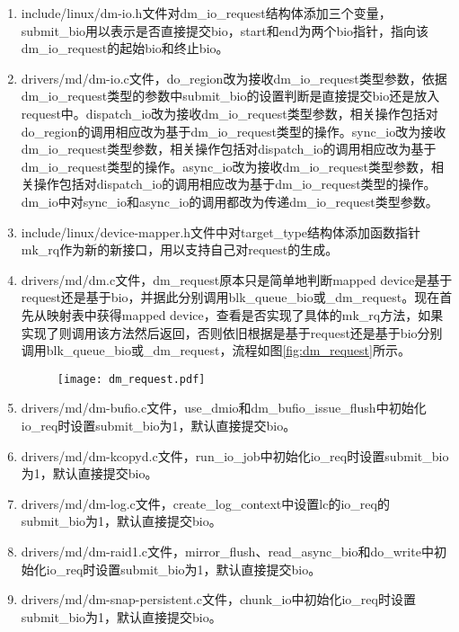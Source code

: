 \begin{enumerate}
    \item include/linux/dm-io.h文件对dm\_io\_request结构体添加三个变量，submit\_bio用以表示是否直接提交bio，start和end为两个bio指针，指向该dm\_io\_request的起始bio和终止bio。
    \item drivers/md/dm-io.c文件，do\_region改为接收dm\_io\_request类型参数，依据dm\_io\_request类型的参数中submit\_bio的设置判断是直接提交bio还是放入request中。dispatch\_io改为接收dm\_io\_request类型参数，相关操作包括对do\_region的调用相应改为基于dm\_io\_request类型的操作。sync\_io改为接收dm\_io\_request类型参数，相关操作包括对dispatch\_io的调用相应改为基于dm\_io\_request类型的操作。async\_io改为接收dm\_io\_request类型参数，相关操作包括对dispatch\_io的调用相应改为基于dm\_io\_request类型的操作。dm\_io中对sync\_io和async\_io的调用都改为传递dm\_io\_request类型参数。
    \item include/linux/device-mapper.h文件中对target\_type结构体添加函数指针mk\_rq作为新的新接口，用以支持自己对request的生成。
    \item drivers/md/dm.c文件，dm\_request原本只是简单地判断mapped device是基于request还是基于bio，并据此分别调用blk\_queue\_bio或\_dm\_request。现在首先从映射表中获得mapped device，查看是否实现了具体的mk\_rq方法，如果实现了则调用该方法然后返回，否则依旧根据是基于request还是基于bio分别调用blk\_queue\_bio或\_dm\_request，流程如图\ref{fig:dm_request}所示。

    \begin{figure}[!htbp]
        \centering
        \texttt{[image: dm\_request.pdf]}
    \end{figure}

    \item drivers/md/dm-bufio.c文件，use\_dmio和dm\_bufio\_issue\_flush中初始化io\_req时设置submit\_bio为1，默认直接提交bio。
    \item drivers/md/dm-kcopyd.c文件，run\_io\_job中初始化io\_req时设置submit\_bio为1，默认直接提交bio。
    \item drivers/md/dm-log.c文件，create\_log\_context中设置lc的io\_req的submit\_bio为1，默认直接提交bio。
    \item drivers/md/dm-raid1.c文件，mirror\_flush、read\_async\_bio和do\_write中初始化io\_req时设置submit\_bio为1，默认直接提交bio。
    \item drivers/md/dm-snap-persistent.c文件，chunk\_io中初始化io\_req时设置submit\_bio为1，默认直接提交bio。
\end{enumerate}

